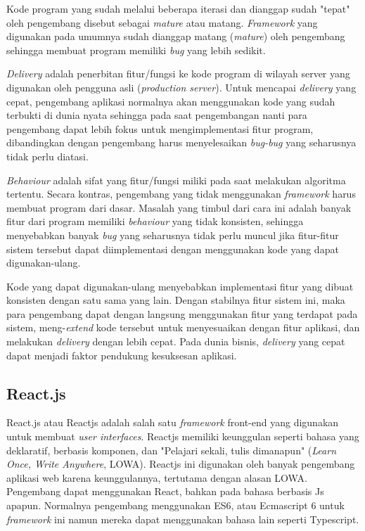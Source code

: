     Kode program yang sudah melalui beberapa iterasi dan dianggap sudah "tepat" oleh pengembang disebut sebagai \textit{mature} atau matang. \textit{Framework} yang digunakan pada umumnya sudah dianggap matang (\textit{mature}) oleh pengembang sehingga membuat program memiliki \textit{bug} yang lebih sedikit.
    
    \textit{Delivery} adalah penerbitan fitur/fungsi ke kode program di wilayah server yang digunakan oleh pengguna asli (\textit{production server}).
    Untuk mencapai \textit{delivery} yang cepat, pengembang aplikasi normalnya akan menggunakan kode yang sudah terbukti di dunia nyata sehingga pada saat pengembangan nanti para pengembang dapat lebih fokus untuk mengimplementasi fitur program, dibandingkan dengan pengembang harus menyelesaikan \textit{bug-bug} yang seharusnya tidak perlu diatasi.
    
    \textit{Behaviour} adalah sifat yang fitur/fungsi miliki pada saat melakukan algoritma tertentu.
    Secara kontras, pengembang yang tidak menggunakan \textit{framework} harus membuat program dari dasar. 
    Masalah yang timbul dari cara ini adalah banyak fitur dari program memiliki \textit{behaviour} yang tidak konsisten, sehingga menyebabkan banyak \textit{bug} yang seharusnya tidak perlu muncul jika fitur-fitur sistem tersebut dapat diimplementasi dengan menggunakan kode yang dapat digunakan-ulang.
    
    Kode yang dapat digunakan-ulang menyebabkan implementasi fitur yang dibuat konsisten dengan satu sama yang lain.
    Dengan stabilnya fitur sistem ini, maka para pengembang dapat dengan langsung menggunakan fitur yang terdapat pada sistem, meng-\textit{extend} kode tersebut untuk menyesuaikan dengan fitur aplikasi, dan melakukan \textit{delivery} dengan lebih cepat.
    Pada dunia bisnis, \textit{delivery} yang cepat dapat menjadi faktor pendukung kesuksesan aplikasi.

\subsection{React.js}
    React.js atau Reactjs adalah salah satu \textit{framework} front-end yang digunakan untuk membuat \textit{user interfaces}\cite{facebook:react-homepage}. Reactjs memiliki keunggulan seperti bahasa yang deklaratif, berbasis komponen, dan "Pelajari sekali, tulis dimanapun" (\textit{Learn Once, Write Anywhere}, LOWA)\cite{facebook:react-homepage}.
    Reactjs ini digunakan oleh banyak pengembang aplikasi web karena keunggulannya, tertutama dengan alasan LOWA. 
    Pengembang dapat menggunakan React, bahkan pada bahasa berbasis Js apapun. Normalnya pengembang menggunakan ES6, atau Ecmascript 6 untuk \textit{framework} ini namun mereka dapat menggunakan bahasa lain seperti Typescript.
        
